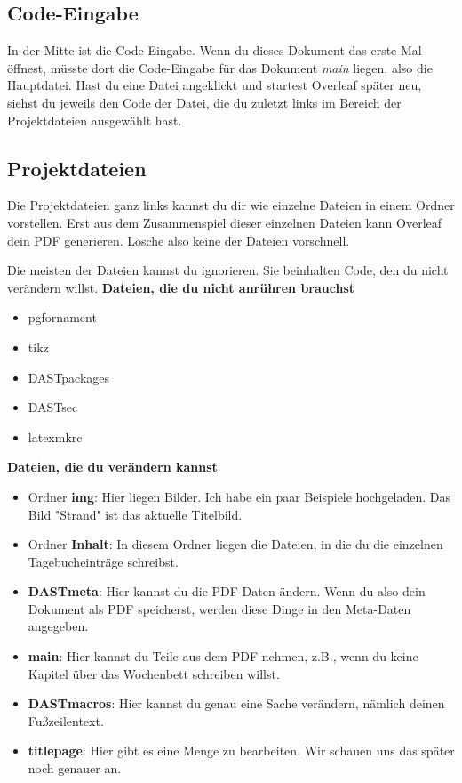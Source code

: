 \subsection{Code-Eingabe}
In der Mitte ist die Code-Eingabe. Wenn du dieses Dokument das erste Mal öffnest, müsste dort die Code-Eingabe für das Dokument \emph{main} liegen, also die Hauptdatei. Hast du eine Datei angeklickt und startest Overleaf später neu, siehst du jeweils den Code der Datei, die du zuletzt links im Bereich der Projektdateien ausgewählt hast.


\subsection{Projektdateien}
Die Projektdateien ganz links kannst du dir wie einzelne Dateien in einem Ordner vorstellen. Erst aus dem Zusammenspiel dieser einzelnen Dateien kann Overleaf dein PDF generieren. Lösche also keine der Dateien vorschnell.

Die meisten der Dateien kannst du ignorieren. Sie beinhalten Code, den du nicht verändern willst. \newline
\textbf{Dateien, die du nicht anrühren brauchst}
\begin{itemize}
       \item pgfornament
    \item tikz
    \    \item DASTpackages
    \item DASTsec
     \item latexmkrc
\end{itemize}
\textbf{Dateien, die du verändern kannst
}\begin{itemize}
    \item Ordner \textbf{img}: Hier liegen Bilder. Ich habe ein paar Beispiele hochgeladen. Das Bild "Strand" ist das aktuelle Titelbild.
    \item Ordner \textbf{Inhalt}: In diesem Ordner liegen die Dateien, in die du die einzelnen Tagebucheinträge schreibst.
    \item \textbf{DASTmeta}: Hier kannst du die PDF-Daten ändern. Wenn du also dein Dokument als PDF speicherst, werden diese Dinge in den Meta-Daten angegeben.
    \item \textbf{main}: Hier kannst du Teile aus dem PDF nehmen, z.B., wenn du keine Kapitel über das Wochenbett schreiben willst.
    \item \textbf{DASTmacros}: Hier kannst du genau eine Sache verändern, nämlich deinen Fußzeilentext.
    \item \textbf{titlepage}: Hier gibt es eine Menge zu bearbeiten. Wir schauen uns das später noch genauer an.

\end{itemize}



